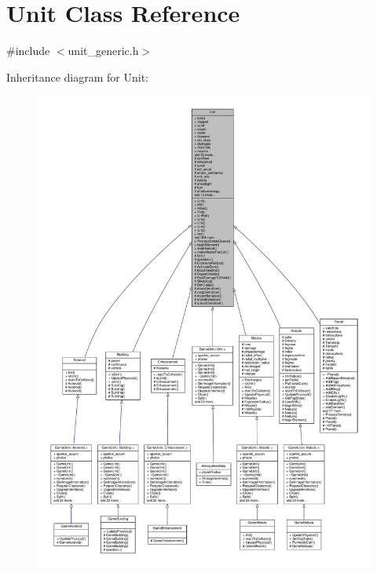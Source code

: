\hypertarget{classUnit}{}\section{Unit Class Reference}
\label{classUnit}


{\ttfamily \#include $<$unit\+\_\+generic.\+h$>$}



Inheritance diagram for Unit\+:
\nopagebreak
\begin{figure}[H]
\begin{center}
\leavevmode
\includegraphics[width=350pt]{d5/d58/classUnit__inherit__graph}
\end{center}
\end{figure}



